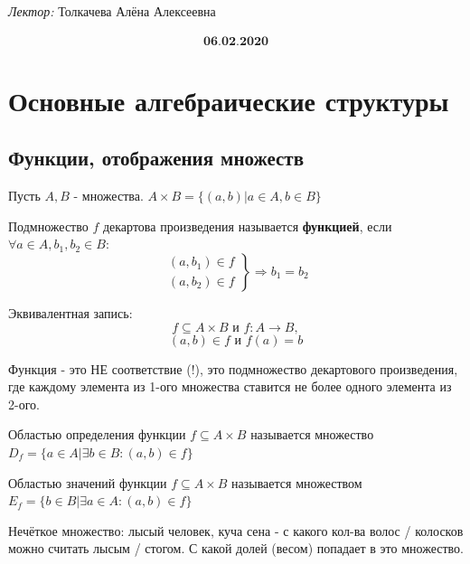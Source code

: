 

\DeclareMathOperator{\eq}{\Leftrightarrow}


\textit{Лектор:} Толкачева Алёна Алексеевна

\begin{align}
	\textbf{06.02.2020}
\end{align}

\section{Основные алгебраические структуры}

\subsection{Функции, отображения множеств}

Пусть $A, B$ - множества. $A \times B = \{ (a,b) | a \in A, b \in B \}$

\begin{definition}[Функция]
	Подмножество $f$ декартова произведения называется \textbf{функцией}, если $\forall a \in A, b_1, b_2 \in B:$
	\[
		\left.
			\begin{aligned}
				(a, b_1) \in f \\
				(a, b_2) \in f
			\end{aligned}
		\right\}
		\Rightarrow b_1 = b_2
	\]
	
	Эквивалентная запись:
	\[ f \subseteq A \times B \text{ и } f: A \to B, \]
	\[ (a,b) \in f \text{ и } f(a) = b \]
\end{definition}

Функция - это НЕ соответствие (!), это подмножество декартового произведения, где каждому элемента из 1-ого множества ставится не более одного элемента из 2-ого.

\begin{definition}
	Областью определения функции $f \subseteq A \times B$ называется множество $D_f = \{a \in A | \exists b \in B: (a, b) \in f\}$
\end{definition}

\begin{definition}
	Областью значений функции $f \subseteq A \times B$ называется множеством $E_f = \{b \in B | \exists a \in A: (a, b) \in f\}$
\end{definition}

\begin{definition}
	Нечёткое множество: лысый человек, куча сена - с какого кол-ва волос / колосков можно считать лысым / стогом. С какой долей (весом) попадает в это множество.
\end{definition}

